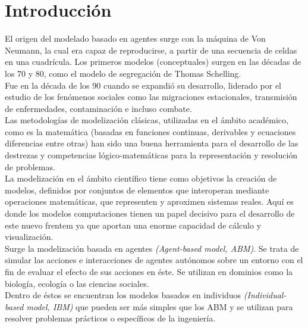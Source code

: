 \documentclass[a4paper,12pt]{report}
\begin{document}
\tableofcontents
    
    

\chapter{Introducción}

El origen del modelado basado en agentes surge con la máquina de Von Neumann, la cual era capaz de reproducirse, a partir de una secuencia de celdas en una cuadrícula. Los primeros modelos (conceptuales) surgen en las décadas de los 70 y 80, como el modelo de segregación de Thomas Schelling. 
\vspace{2mm}\\
Fue en la década de los 90 cuando se expandió su desarrollo, liderado por el estudio de los fenómenos sociales como las migraciones estacionales, transmisión de enfermedades, contaminación e incluso combate.
\vspace{4mm}\\
Las metodologías de modelización clásicas, utilizadas en el ámbito académico, como es la matemática (basadas en funciones continuas, derivables y ecuaciones diferencias entre otras) han sido una buena herramienta para el desarrollo de las destrezas y competencias lógico-matemáticas para la representación y resolución de problemas.
\vspace{2mm}\\
La modelización en el ámbito científico tiene como objetivos la creación de modelos, definidos por conjuntos de elementos que interoperan mediante operaciones matemáticas, que representen y aproximen sistemas reales. Aquí es donde los modelos computaciones tienen un papel decisivo para el desarrollo de este nuevo frentem ya que aportan una enorme capacidad de cálculo y visualización.
\vspace{4mm}\\
Surge la modelización basada en agentes \textit{(Agent-based model, ABM)}. Se trata de simular las acciones e interacciones de agentes autónomos sobre un entorno con el fin de evaluar el efecto de sus acciones en éste. Se utilizan en dominios como la biología, ecología o las ciencias sociales.
\vspace{2mm}\\
Dentro de éstos se encuentran los modelos basados en individuos \textit{(Individual-based model, IBM)} que pueden ser más simples que los ABM y se utilizan para resolver problemas prácticos o específicos de la ingeniería.
\end{document}
